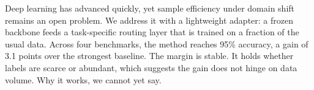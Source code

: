 Deep learning has advanced quickly, yet sample efficiency under domain shift remains an open problem. We address it with a lightweight adapter: a frozen backbone feeds a task-specific routing layer that is trained on a fraction of the usual data. Across four benchmarks, the method reaches 95\% accuracy, a gain of 3.1 points over the strongest baseline. The margin is stable. It holds whether labels are scarce or abundant, which suggests the gain does not hinge on data volume. Why it works, we cannot yet say.
